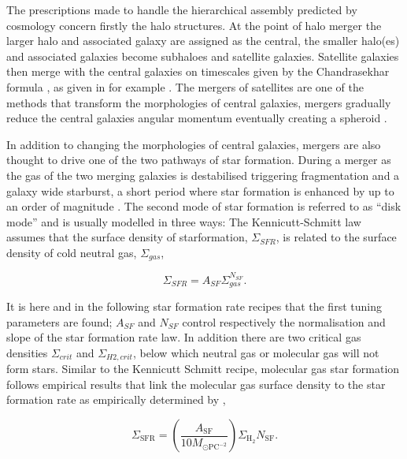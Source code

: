 The prescriptions made to handle the hierarchical assembly predicted by \LCDM cosmology concern firstly the halo structures. At the point of halo merger the larger halo and associated galaxy are assigned as the central, the smaller halo(es) and associated galaxies become subhaloes and satellite galaxies. Satellite galaxies then merge with the central galaxies on timescales given by the Chandrasekhar formula \citep{Chandrasekhar1943DYNAMICALFRICTION}, as given in for example \citet[e.g.][]{Boylan-Kolchin2008}. The mergers of satellites are one of the methods that transform the morphologies of central galaxies, mergers gradually reduce the central galaxies angular momentum eventually creating a spheroid \cite{Hopkins2009HOWMERGERS}. 

In addition to changing the morphologies of central galaxies, mergers are also thought to drive one of the two pathways of star formation. During a merger as the gas of the two merging galaxies is destabilised triggering fragmentation and a galaxy wide starburst, a short period where star formation is enhanced by up to an order of magnitude \citep{Hopkins2009HOWMERGERS}. The second mode of star formation is referred to as ``disk mode'' and is usually modelled in three ways: The Kennicutt-Schmitt law \citep{KennicuttJr.1998TheGalaxies} assumes that the surface density of starformation, $\Sigma_{SFR}$, is related to the surface density of cold neutral gas, $\Sigma_{gas}$,

\begin{equation}
    \Sigma_{SFR} = A_{SF}\Sigma_{gas}^{N_{SF}}.
\end{equation}

It is here and in the following star formation rate recipes that the first tuning parameters are found; $A_{SF}$ and $N_{SF}$ control respectively the normalisation and slope of the star formation rate law. In addition there are two critical gas densities $\Sigma_{crit}$ and $\Sigma_{H2,crit}$, below which neutral gas or molecular gas will not form stars. Similar to the Kennicutt Schmitt recipe, molecular gas star formation follows empirical results that link the molecular gas surface density to the star formation rate as empirically determined by \citet{Bigiel2008TheResolution},

\begin{equation}
    \Sigma_{\mathrm{SFR}}=\left(\frac{A_{\mathrm{SF}}}{10 M_{\odot \mathrm{PC}^{-2}}}\right) \Sigma_{\mathrm{H}_{2}} N_{\mathrm{SF}}.
\end{equation}

